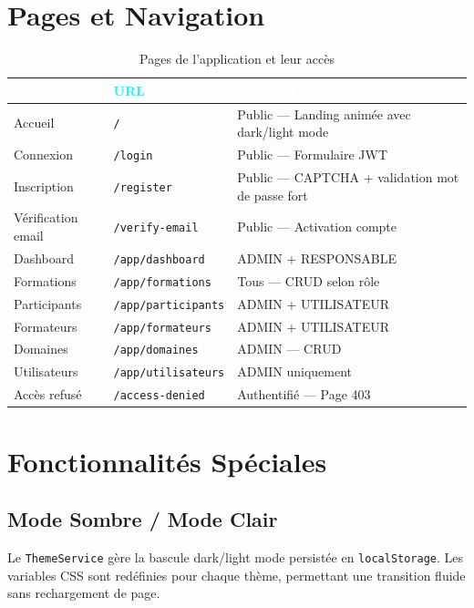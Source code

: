 \documentclass[12pt,a4paper]{report}
\begin{document}
\section{Pages et Navigation}

\begin{table}[H]
\centering
\caption{Pages de l'application et leur acc\`{e}s}
\begin{tabularx}{\textwidth}{|L{3cm}|L{4cm}|X|}
\hline
{} \textcolor{white}{\textbf{Page}} & \textcolor{cyan}{\textbf{URL}} & \textcolor{white}{\textbf{Acc\`{e}s / Description}} \\
\hline
Accueil & \texttt{/} & Public --- Landing anim\'{e}e avec dark/light mode \\
\hline
Connexion & \texttt{/login} & Public --- Formulaire JWT \\
\hline
Inscription & \texttt{/register} & Public --- CAPTCHA + validation mot de passe fort \\
\hline
V\'{e}rification email & \texttt{/verify-email} & Public --- Activation compte \\
\hline
Dashboard & \texttt{/app/dashboard} & ADMIN + RESPONSABLE \\
\hline
Formations & \texttt{/app/formations} & Tous --- CRUD selon r\^{o}le \\
\hline
Participants & \texttt{/app/participants} & ADMIN + UTILISATEUR \\
\hline
Formateurs & \texttt{/app/formateurs} & ADMIN + UTILISATEUR \\
\hline
Domaines & \texttt{/app/domaines} & ADMIN --- CRUD \\
\hline
Utilisateurs & \texttt{/app/utilisateurs} & ADMIN uniquement \\
\hline
Acc\`{e}s refus\'{e} & \texttt{/access-denied} & Authentifi\'{e} --- Page 403 \\
\hline
\end{tabularx}
\end{table}

\section{Fonctionnalit\'{e}s Sp\'{e}ciales}

\subsection{Mode Sombre / Mode Clair}

Le \texttt{ThemeService} g\`{e}re la bascule dark/light mode persist\'{e}e en \texttt{localStorage}. Les variables CSS sont red\'{e}finies pour chaque th\`{e}me, permettant une transition fluide sans rechargement de page.
\end{document}
